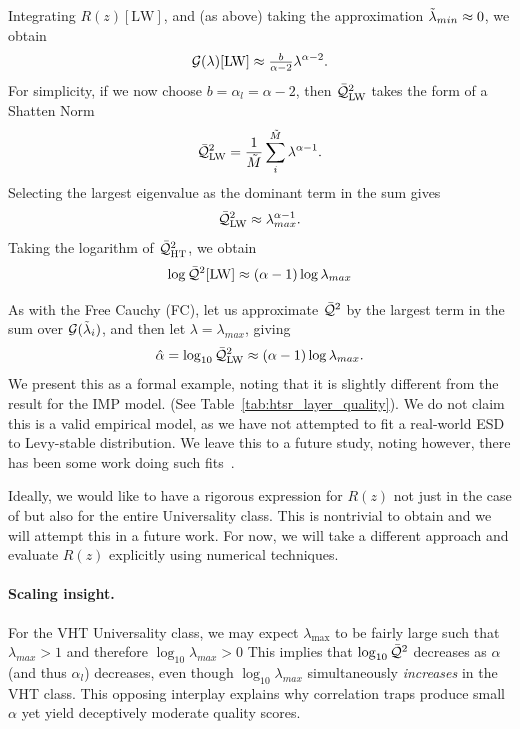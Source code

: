 Integrating $R(z)[\mathrm{LW}]$, and (as above) taking the approximation ${\tilde{\lambda}_{min}}\approx 0$, we obtain 
\begin{equation}
\label{eqn:LW_model_1} 
\mathcal{G(\lambda)}[\mathrm{LW}] \approx \tfrac{b}{\alpha-2} \lambda^{\alpha-2}  .
\end{equation}
%
For simplicity, if we now choose $b=\alpha_{l}=\alpha-2$, then $\bar{\mathcal{Q}}^{2}_{\mathrm{LW}}$ takes the form of a Shatten Norm
\begin{equation}
  \label{eqn:LW_model_2}
  \bar{\mathcal{Q}}^{2}_{\mathrm{LW}} = \frac{1}{\tilde{M}}\sum_{i}^{\tilde{M}}\lambda^{\alpha-1}  .
\end{equation}
%
Selecting the largest eigenvalue as the dominant term in the sum gives
\begin{equation}
\label{eqn:LW_model_2max}
  \bar{\mathcal{Q}}^{2}_{\mathrm{LW}} \approx \lambda_{max}^{\alpha-1}  .
\end{equation}
Taking the logarithm of $\bar{\mathcal{Q}}^{2}_{\mathrm{HT}} $, we obtain 
\begin{equation}
\label{eqn:LW_model_3} 
\log \bar{\mathcal{Q}}^{2}[\mathrm{LW}] \approx (\alpha-1)\log\lambda_{max}
\end{equation}

As with the Free Cauchy (FC), let us approximate $\bar{\mathcal{Q}}^{2}$ by the largest term in the sum over $\mathcal{G}(\tilde{\lambda}_{i})$, and then let $\lambda=\lambda_{max}$, giving
\begin{equation} 
\label{eqn:LW_model_4} 
\hat\alpha = \log_{10} \bar{\mathcal{Q}}^{2}_{\mathrm{LW}} \approx (\alpha-1)\log\lambda_{max}   .
\end{equation}
We present this as a formal example, noting that it is slightly different from the result for the IMP model.
(See Table~\ref{tab:htsr_layer_quality}). 
We do not claim this is a valid empirical model, as we have not attempted to fit a real-world ESD to Levy-stable distribution.  
We leave this to a future study, noting however, there has been some work doing such fits~\cite{li2024exploring}.

Ideally, we would like to have a rigorous expression for $R(z)$ not just
in the case of \IdealLearning but also for the entire \FatTailed Universality class.
This is nontrivial to obtain and we will attempt this in a future work.
For now, we will take a different approach and evaluate $R(z)$ explicitly using numerical techniques.

\paragraph{Scaling insight.}
For the VHT Universality class, we may expect $\lambda_{\max}$ to be fairly large such that
$\lambda_{max}>1$ and therefore $\log_{10}\lambda_{max}>0$
This implies that  $\log_{10}\bar{\mathcal{Q}}^{2}$ decreases  as $\alpha$ (and thus $\alpha_l$) decreases, even though
$\log_{10}\lambda_{max}$ simultaneously \emph{increases} in the VHT class.
This opposing interplay explains why correlation traps produce small $\alpha$ yet yield deceptively moderate quality scores.

